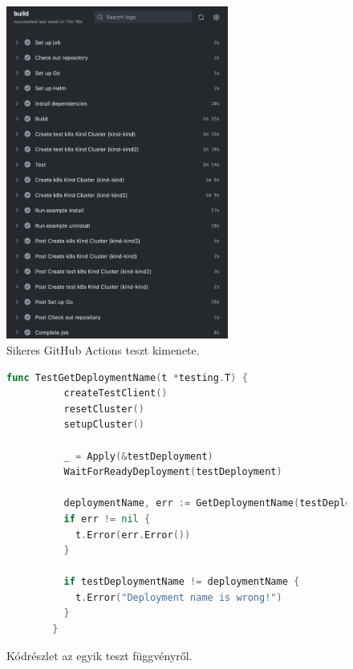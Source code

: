 \begin{figure}[ht]
  \centering
       \includegraphics[width=0.65\textwidth]{figures/kli/actions-run-log.png}
        \caption{Sikeres GitHub Actions teszt kimenete.}
         \label{github-actions-run-log}
\end{figure}

\begin{figure}
  \centering
  \begin{minipage}{\linewidth}
      \begin{lstlisting}[language=go]
        func TestGetDeploymentName(t *testing.T) {
          createTestClient()
          resetCluster()
          setupCluster()
        
          _ = Apply(&testDeployment)
          WaitForReadyDeployment(testDeployment)
        
          deploymentName, err := GetDeploymentName(testDeploymentReleaseName, testNamespaceName)
          if err != nil {
            t.Error(err.Error())
          }
        
          if testDeploymentName != deploymentName {
            t.Error("Deployment name is wrong!")
          }
        }
      \end{lstlisting}
  \end{minipage}
  \caption{Kódrészlet az egyik teszt függvényről.}
    \label{test-code-snippet}
\end{figure}

